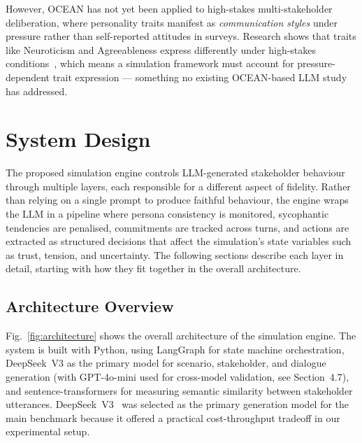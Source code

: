 \documentclass[12pt, a4paper]{report}
\begin{document}
However, OCEAN has not yet been applied to high-stakes multi-stakeholder deliberation, where personality traits manifest as \textit{communication styles} under pressure rather than self-reported attitudes in surveys. Research shows that traits like Neuroticism and Agreeableness express differently under high-stakes conditions~\cite{byrne2015chokes, green2019personality}, which means a simulation framework must account for pressure-dependent trait expression --- something no existing OCEAN-based LLM study has addressed.




\chapter{System Design}

The proposed simulation engine controls LLM-generated stakeholder behaviour through multiple layers, each responsible for a different aspect of fidelity. Rather than relying on a single prompt to produce faithful behaviour, the engine wraps the LLM in a pipeline where persona consistency is monitored, sycophantic tendencies are penalised, commitments are tracked across turns, and actions are extracted as structured decisions that affect the simulation's state variables such as trust, tension, and uncertainty. The following sections describe each layer in detail, starting with how they fit together in the overall architecture.


\section{Architecture Overview}

Fig.~\ref{fig:architecture} shows the overall architecture of the simulation engine. The system is built with Python, using LangGraph for state machine orchestration, DeepSeek~V3 as the primary model for scenario, stakeholder, and dialogue generation (with GPT-4o-mini used for cross-model validation, see Section~4.7), and sentence-transformers for measuring semantic similarity between stakeholder utterances. DeepSeek~V3~\cite{deepseekv3} was selected as the primary generation model for the main benchmark because it offered a practical cost-throughput tradeoff in our experimental setup.
\end{document}
